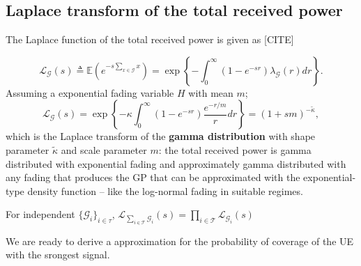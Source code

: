 \documentclass[conference]{IEEEtran}
\theoremstyle{definition}
\theoremstyle{plain}
\begin{document}
          \subsection{Laplace transform of the total received power}

          The Laplace function of the total received power is given as [CITE]

          \begin{equation}
            \mathcal{L}_{\mathcal{G}}(s)\triangleq \mathbb{E}\left(e^{-s\sum\limits_{x \in \mathcal{G}}x}\right)= \exp\left\{-\int_0^{\infty}(1-e^{-sr}) \lambda_{\mathcal{G}}(r) dr \right\}.
          \end{equation}
          Assuming a exponential fading variable $H$ with mean $m$;
          \begin{equation}
            \label{eq:lapexp}
            \mathcal{L}_{\mathcal{G}}(s)= \exp\left\{-\mathcal{\kappa}\int_0^{\infty}(1-e^{-sr})\frac{e^{-r/m}}{r} dr \right\}=(1+sm)^{-\tilde{\kappa}},
          \end{equation}
          which is the Laplace transform of the \textbf{gamma distribution} with shape parameter $\tilde{\kappa}$ and scale parameter $m$: the total received power is gamma distributed with exponential fading and approximately gamma distributed with any fading that produces the GP that can be approximated with the exponential-type density function – like the log-normal fading in suitable regimes.
          
          For independent $\{\mathcal{G}_i\}_{i \in \mathcal{\tau}}$, $\mathcal{L}_{\sum_{i \in \mathcal{T}} \mathcal{G}_i}(s) = \prod_{i \in \mathcal{T}} \mathcal{L}_{\mathcal{G}_i}(s)$
          
          We are ready to derive a approximation for the probability of coverage of the UE with the srongest signal.
\end{document}
